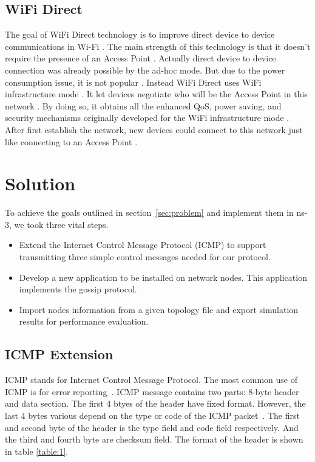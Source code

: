 \documentclass[12pt,journal]{IEEEtran}
\begin{document}
\subsection{WiFi Direct}
The goal of WiFi Direct technology is to improve direct device to device communications in Wi-Fi \cite{Mur}. The main strength of this technology is that it doesn’t require the presence of an Access Point \cite{Mur}. Actually direct device to device connection was already possible by the ad-hoc mode. But due to the power consumption issue, it is not popular \cite{Mur}. Instead WiFi Direct uses WiFi infrastructure mode \cite{Mur}. It let devices negotiate who will be the Access Point in this network \cite{Mur}. By doing so, it obtains all the enhanced QoS, power saving, and security mechanisms originally developed for the WiFi infrastructure mode \cite{Mur}. After first establish the network, new devices could connect to this network just like connecting to an Access Point \cite{Mur}.

\section{Solution}
To achieve the goals outlined in section~\ref{sec:problem} and implement them in ns-3, we took three vital steps.

\begin{itemize}
 \item Extend the Internet Control Message Protocol (ICMP) to support transmitting three simple control messages needed for our protocol.
 \item Develop a new application to be installed on network nodes. This application implements the gossip protocol.
 \item Import nodes information from a given topology file and export simulation results for performance evaluation.
\end{itemize}

\subsection{ICMP Extension}

ICMP stands for Internet Control Message Protocol. The most common use of ICMP is for error reporting~\cite{james}. ICMP message contains two parts: 8-byte header and data section. The first 4 btyes of the header have fixed format. However, the last 4 bytes various depend on the type or code of the ICMP packet~\cite{forouzan}. The first and second byte of the header is the type field and code field respectively. And the third and fourth byte are checksum field. The format of the header is shown in table \ref{table:1}.
\end{document}
